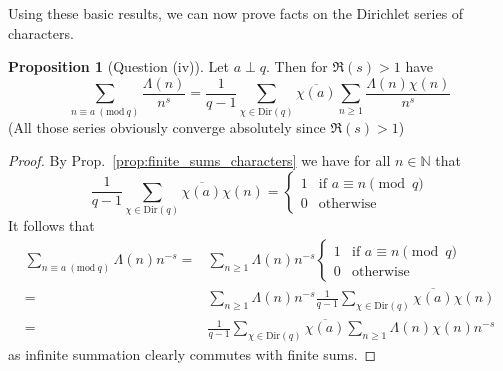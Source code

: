\documentclass{scrartcl}
\newcommand{\N}{\mathbb{N}}
\theoremstyle{definition}
\newtheorem{proposition}[definition]{Proposition}
\begin{document}
Using these basic results, we can now prove facts on the Dirichlet series of characters.
\begin{proposition}[Question (iv)]
    \label{prop:representation_mangoldt_series_congruent_a}
    Let $a \perp q$. Then for $\Re(s) > 1$ have
    \begin{equation*}
        \sum_{n \equiv a \ (\text{mod} \ q)} \frac {\Lambda(n)} {n^s} = \frac 1 {q - 1} \sum_{\chi \in \mathrm{Dir}(q)} \overline{\chi(a)} \sum_{n \geq 1} \frac {\Lambda(n) \chi(n)} {n^s}
    \end{equation*}
    (All those series obviously converge absolutely since $\Re(s) > 1$)
\end{proposition}
\begin{proof}
    By Prop.~\ref{prop:finite_sums_characters} we have for all $n \in \N$ that
    \begin{equation*}
        \frac 1 {q - 1} \sum_{\chi \in \mathrm{Dir}(q)} \overline{\chi(a)} \chi(n) = \begin{cases}
            1 & \text{if $a \equiv n \pmod q$} \\
            0 & \text{otherwise}
        \end{cases}
    \end{equation*}
    It follows that
    \begin{align*}
        \sum_{n \equiv a \ (\text{mod} \ q)} \Lambda(n) n^{-s} =& \sum_{n \geq 1} \Lambda(n) n^{-s} \begin{cases}
            1 & \text{if $a \equiv n \pmod q$} \\
            0 & \text{otherwise}
        \end{cases} \\
        =& \sum_{n \geq 1} \Lambda(n) n^{-s} \frac 1 {q - 1} \sum_{\chi \in \mathrm{Dir}(q)} \overline{\chi(a)} \chi(n) \\
        =& \frac 1 {q - 1} \sum_{\chi \in \mathrm{Dir}(q)} \overline{\chi(a)} \sum_{n \geq 1} \Lambda(n) \chi(n) n^{-s} 
    \end{align*}
    as infinite summation clearly commutes with finite sums.
\end{proof}
\end{document}
